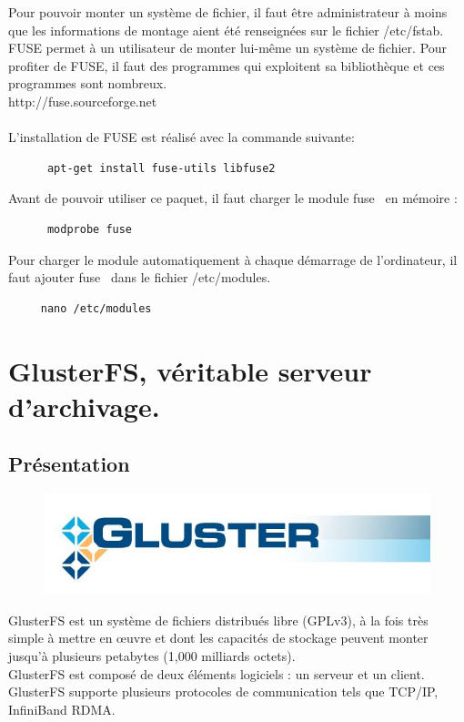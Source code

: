 \documentclass[12pt]{report}
\begin{document}
    Pour pouvoir monter un système de fichier, il faut être administrateur à moins que les informations de montage aient été renseignées sur le fichier /etc/fstab.\\
    FUSE permet à un utilisateur de monter lui-même un système de fichier. Pour profiter de FUSE, il faut des programmes qui exploitent sa bibliothèque
    et  ces programmes sont nombreux.\\
    http://fuse.sourceforge.net\\\\
    L'installation de FUSE est réalisé avec la commande suivante:\\
    \begin{lstlisting}
	  apt-get install fuse-utils libfuse2
	  \end{lstlisting}
    Avant de pouvoir utiliser ce paquet, il faut charger le module \og fuse\fg~ en mémoire :\\
    \begin{lstlisting}
	  modprobe fuse
	  \end{lstlisting}
    Pour charger le module automatiquement à chaque démarrage de l'ordinateur, il faut ajouter \og fuse\fg~ dans le fichier \og /etc/modules\fg.\\
    \begin{lstlisting}
	 nano /etc/modules
	 \end{lstlisting}

	\chapter{GlusterFS, véritable serveur d'archivage.}
		\section{Présentation}

		\begin{figure}[H]
			\begin{center}
				\includegraphics[width=0.6\linewidth]{images/glusterfs.png}
			\end{center}
		\end{figure}

GlusterFS est un système de fichiers distribués libre (GPLv3), à la fois très simple à mettre en œuvre et dont les capacités de stockage peuvent monter jusqu'à plusieurs petabytes (1,000 milliards octets).\\
GlusterFS est composé de deux éléments logiciels : un serveur et un client.\\
GlusterFS supporte plusieurs protocoles de communication tels que TCP/IP, InfiniBand RDMA.\\
\end{document}
